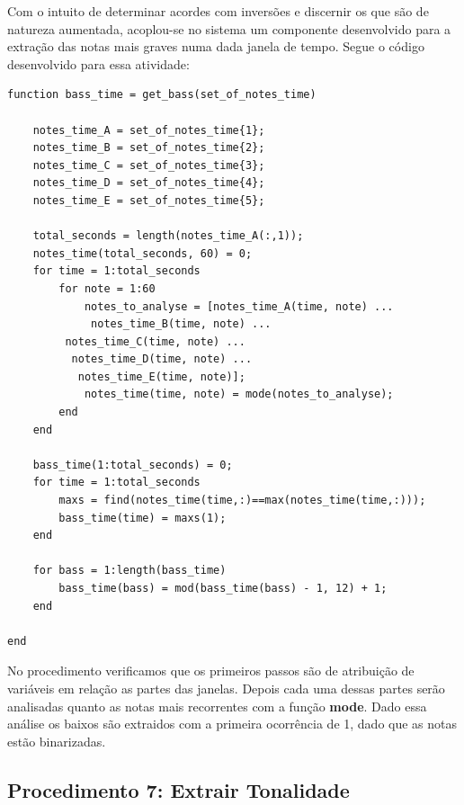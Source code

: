 Com o intuito de determinar acordes com inversões e discernir os que são de natureza aumentada, acoplou-se no sistema um componente desenvolvido para a extração das notas mais graves numa dada janela de tempo. Segue o código desenvolvido para essa atividade:
\begin{lstlisting}
function bass_time = get_bass(set_of_notes_time)

	notes_time_A = set_of_notes_time{1};
	notes_time_B = set_of_notes_time{2};
	notes_time_C = set_of_notes_time{3};
	notes_time_D = set_of_notes_time{4};
	notes_time_E = set_of_notes_time{5};

	total_seconds = length(notes_time_A(:,1));
	notes_time(total_seconds, 60) = 0;
	for time = 1:total_seconds
		for note = 1:60
			notes_to_analyse = [notes_time_A(time, note) ...
			 notes_time_B(time, note) ...
		 notes_time_C(time, note) ...
		  notes_time_D(time, note) ...
		   notes_time_E(time, note)];
			notes_time(time, note) = mode(notes_to_analyse);
		end
	end

    bass_time(1:total_seconds) = 0;
	for time = 1:total_seconds
		maxs = find(notes_time(time,:)==max(notes_time(time,:)));
		bass_time(time) = maxs(1);
	end

	for bass = 1:length(bass_time)
		bass_time(bass) = mod(bass_time(bass) - 1, 12) + 1;
	end

end
\end{lstlisting}

No procedimento verificamos que os primeiros passos são de atribuição de variáveis em relação as partes das janelas. Depois cada uma dessas partes serão analisadas quanto as notas mais recorrentes com a função \textbf{mode}. Dado essa análise os baixos são extraidos com a primeira ocorrência de 1, dado que as notas estão binarizadas.

\subsection{Procedimento 7: Extrair Tonalidade}

